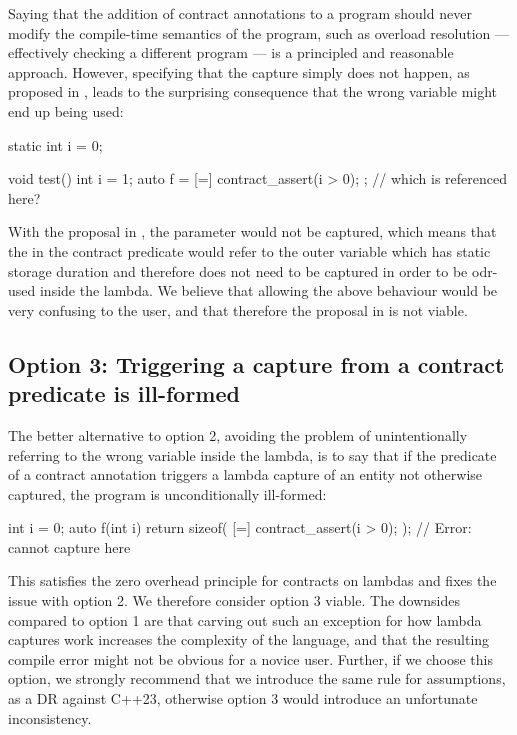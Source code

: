 Saying that the addition of contract annotations to a program should never modify the compile-time semantics of the program, such as overload resolution --- effectively checking a different program --- is a principled and reasonable approach. However, specifying that the capture simply does not happen, as proposed in \cite{P2932R2}, leads to the surprising consequence that the wrong variable might end up being used:

\begin{codeblock}
static int i = 0;

void test() {
  int i = 1;
  auto f = [=] { contract_assert(i > 0); };   // which  is referenced here?
}
\end{codeblock}

With the proposal in \cite{P2932R2}, the parameter  would not be captured, which means that the  in the contract predicate would refer to the outer  variable which has static storage duration and therefore does not need to be captured in order to be odr-used inside the lambda. We believe that allowing the above behaviour would be very confusing to the user, and that therefore the proposal in \cite{P2932R2} is not viable.
 
 \subsection*{Option 3: Triggering a capture from a contract predicate is ill-formed}
 
The better alternative to option 2, avoiding the problem of unintentionally referring to the wrong variable inside the lambda, is to say that if the predicate of a contract annotation triggers a lambda capture of an entity not otherwise captured, the program is unconditionally ill-formed:
 
 \begin{codeblock}
int i = 0;
auto f(int i) {
  return sizeof( [=] { contract_assert(i > 0); } ); // Error: cannot capture  here 
}
\end{codeblock}

This satisfies the zero overhead principle for contracts on lambdas and fixes the issue with option 2. We therefore consider option 3 viable. The downsides compared to option 1 are that carving out  such an exception for how lambda captures work increases the complexity of the language, and that the resulting compile error might not be obvious for a novice user. Further, if we choose this option, we strongly recommend that we introduce the same rule for assumptions, as a DR against C++23, otherwise option 3 would introduce an unfortunate inconsistency.
 
